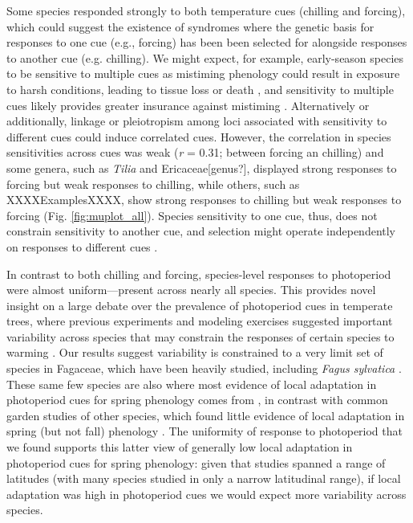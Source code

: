 \documentclass{article}\usepackage[]{graphicx}\usepackage[]{color}
\begin{document}
Some species responded strongly to both temperature cues (chilling and forcing), which could suggest the existence of syndromes where the genetic basis for responses to one cue (e.g., forcing) has been been selected for alongside responses to another cue (e.g. chilling). We might expect, for example, early-season species to be sensitive to multiple cues as mistiming phenology could result in exposure to harsh conditions, leading to tissue loss or death \citep{frostbook}, and sensitivity to multiple cues likely provides greater insurance against mistiming \citep{memegan2021}. Alternatively or additionally, linkage or pleiotropism among loci associated with sensitivity to different cues \citep{nakagawa2005} could induce correlated cues. However, the correlation in species sensitivities across cues was weak (\emph{r} = 0.31; between forcing an chilling) and some genera, such as \emph{Tilia} and Ericaceae[genus?], displayed strong responses to forcing but weak responses to chilling, while others, such as XXXXExamplesXXXX, show strong responses to chilling but weak responses to forcing (Fig. \ref{fig:muplot_all}). Species sensitivity to one cue, thus, does not constrain sensitivity to another cue, and selection might operate independently on responses to different cues \citep{bonamour2019}.

In contrast to both chilling and forcing, species-level responses to photoperiod were almost uniform---present across nearly all species. This provides novel insight on a large debate over the prevalence of photoperiod cues in temperate trees, where previous experiments  \citep{Basler:2012,zohner2016} and modeling exercises \citep[e.g.,][]{Hunter:1992jw,schaber20203} suggested important variability across species that may constrain the responses of certain species to warming \citep{way2015}. Our results suggest variability is constrained to a very limit set of species in Fagaceae, which have been heavily studied, including \emph{Fagus sylvatica} \citep[e.g.,][]{Basler:2012,zohner2016,kramer2017}. These same few species are also where most evidence of local adaptation in photoperiod cues for spring phenology comes from \citep[e.g.,][]{kramer2017}, in contrast with common garden studies of other species, which found little evidence of local adaptation in spring (but not fall) phenology \citep{aitken2016}. The uniformity of response to photoperiod that we found supports this latter view of generally low local adaptation in photoperiod cues for spring phenology: given that studies spanned a range of latitudes (with many species studied in only a narrow latitudinal range), if local adaptation was high in photoperiod cues we would expect more variability across species. 
\end{document}
